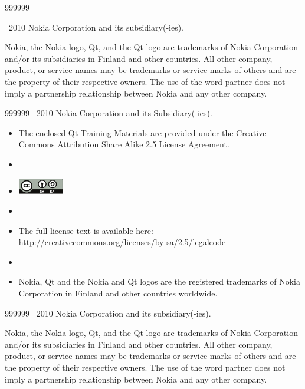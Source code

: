 \begin{slide}{999999}

\vspace{5em}
\textcopyright~2010 Nokia Corporation and its subsidiary(-ies).

\vspace{2em}
{\small Nokia, the Nokia logo, Qt, and the Qt logo are trademarks of Nokia
Corporation and/or its subsidiaries in Finland and other countries.
All other company, product, or service names may be trademarks or service marks
of others and are the property of their respective owners. The use of the word
partner does not imply a partnership relationship between Nokia and any other
company.}

\end{slide}

{
  
  \begin{slide}{999999}
    \vspace{5em}
    \textcopyright~2010 Nokia Corporation and its Subsidiary(-ies).    
    \vspace{2em}                                                     
    \begin{itemize}
      \item[] \footnotesize{The enclosed Qt Training Materials are provided under the 
        Creative Commons Attribution Share Alike 2.5 License Agreement.}  
      \item[]
      \item[] \mbox{\includegraphics[width=20mm]{images/by-sa}}
      \item[]
      \item[] \footnotesize{The full license text is available here:  
      \url{http://creativecommons.org/licenses/by-sa/2.5/legalcode}}
      \item[]    
      \item[] \footnotesize{Nokia, Qt and the Nokia and Qt logos are the registered trademarks 
      of Nokia Corporation in Finland and other countries worldwide.}
    \end{itemize}
    
  \end{slide}
  
} %
{ %
  
  \begin{slide}{999999}
    \vspace{5em}
    \textcopyright~2010 Nokia Corporation and its subsidiary(-ies).
    
    \vspace{2em}
    {\small Nokia, the Nokia logo, Qt, and the Qt logo are trademarks of Nokia
      Corporation and/or its subsidiaries in Finland and other countries.
      All other company, product, or service names may be trademarks or service marks
      of others and are the property of their respective owners. The use of the word
      partner does not imply a partnership relationship between Nokia and any other
      company.}
    
  \end{slide}
}
